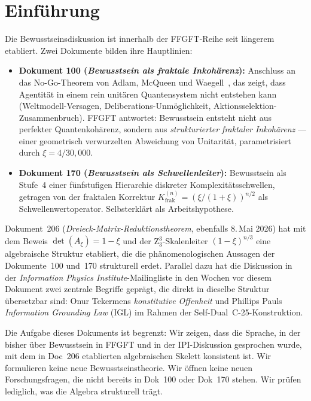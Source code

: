 
\section{Einführung}\label{sec:einleitung}

Die Bewusstseinsdiskussion ist innerhalb der FFGFT-Reihe seit längerem etabliert. Zwei Dokumente bilden ihre Hauptlinien:

\begin{itemize}
\item \textbf{Dokument 100 (\emph{Bewusstsein als fraktale Inkohärenz}):} Anschluss an das No-Go-Theorem von Adlam, McQueen und Waegell~\cite{Adlam2025}, das zeigt, dass Agentität in einem rein unitären Quantensystem nicht entstehen kann (Weltmodell-Versagen, Deliberations-Unmöglichkeit, Aktionsselektion-Zusammenbruch). FFGFT antwortet: Bewusstsein entsteht nicht aus perfekter Quantenkohärenz, sondern aus \emph{strukturierter fraktaler Inkohärenz} — einer geometrisch verwurzelten Abweichung von Unitarität, parametrisiert durch $\xi = 4/30{,}000$.
\item \textbf{Dokument 170 (\emph{Bewusstsein als Schwellenleiter}):} Bewusstsein als Stufe~4 einer fünfstufigen Hierarchie diskreter Komplexitätsschwellen, getragen von der fraktalen Korrektur $K_{\text{frak}}^{(n)} = (\xi/(1+\xi))^{n/2}$ als Schwellenwertoperator. Selbsterklärt als Arbeitshypothese.
\end{itemize}

Dokument~206 (\emph{Dreieck-Matrix-Reduktionstheorem}, ebenfalls 8.\,Mai 2026) hat mit dem Beweis $\det(A_\xi) = 1-\xi$ und der Z$_3^3$-Skalenleiter $(1-\xi)^{n/3}$ eine algebraische Struktur etabliert, die die phänomenologischen Aussagen der Dokumente~100 und~170 strukturell erdet. Parallel dazu hat die Diskussion in der \emph{Information Physics Institute}-Mailingliste in den Wochen vor diesem Dokument zwei zentrale Begriffe geprägt, die direkt in dieselbe Struktur übersetzbar sind: Onur Tekermens \emph{konstitutive Offenheit} und Phillips Pauls \emph{Information Grounding Law} (IGL) im Rahmen der Self-Dual~C-25-Konstruktion.

\medskip

Die Aufgabe dieses Dokuments ist begrenzt: Wir zeigen, dass die Sprache, in der bisher über Bewusstsein in FFGFT und in der IPI-Diskussion gesprochen wurde, mit dem in Doc~206 etablierten algebraischen Skelett konsistent ist. Wir formulieren keine neue Bewusstseinstheorie. Wir öffnen keine neuen Forschungsfragen, die nicht bereits in Dok~100 oder Dok~170 stehen. Wir prüfen lediglich, was die Algebra strukturell trägt.

